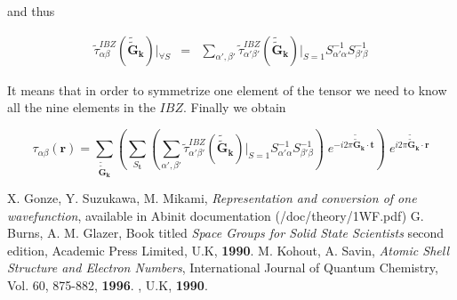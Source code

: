 \documentclass[a4paper,12pt]{report}
\begin{document}
and thus

\begin{eqnarray}
\tilde{\tau}_{\alpha\beta}^{IBZ}(\tilde{\tilde{\mathbf{G}}}_{\mathbf{k}})\bigl\vert_{\forall S} &=& \sum_{\alpha',\beta'} \tilde{\tau}_{\alpha'\beta'}^{IBZ}(\tilde{\tilde{\mathbf{G}}}_{\mathbf{k}})\bigl\vert_{S=1} S_{\alpha'\alpha}^{-1} S_{\beta'\beta}^{-1}  \end{eqnarray}

It means that in order to symmetrize one element of the tensor we need to know all the nine elements in the $IBZ$.
Finally we obtain

\begin{equation}
\tau_{\alpha\beta}(\mathbf{r}) = \sum_{\tilde{\tilde{\mathbf{G}}}_{\mathbf{k}}} \left( \sum_{S_{\mathbf{t}}} \left(  \sum_{\alpha',\beta'} \tilde{\tau}_{\alpha'\beta'}^{IBZ}(\tilde{\tilde{\mathbf{G}}}_{\mathbf{k}})\bigl\vert_{S=1} S_{\alpha'\alpha}^{-1} S_{\beta'\beta}^{-1}     \right) \; e^{-i2\pi \tilde{\tilde{\mathbf{G}}}_{\mathbf{k}} \cdot \mathbf{t}} \right) \; e^{i2\pi \tilde{\tilde{\mathbf{G}}}_{\mathbf{k}} \cdotp \mathbf{r} }
\end{equation}







\begin{thebibliography}{1}

\footnotesize

 X. Gonze, Y. Suzukawa, M. Mikami, \textit{Representation and conversion of one wavefunction}, available in Abinit documentation (/doc/theory/1WF.pdf)
 G. Burns, A. M. Glazer, Book titled \textit{Space Groups for Solid State Scientists} second edition, Academic Press Limited, U.K, \textbf{1990}.
 M. Kohout, A. Savin, \textit{Atomic Shell Structure and Electron Numbers}, International Journal of Quantum Chemistry, Vol. 60, 875-882, \textbf{1996}.
, U.K, \textbf{1990}.
\end{thebibliography}
\end{document}
